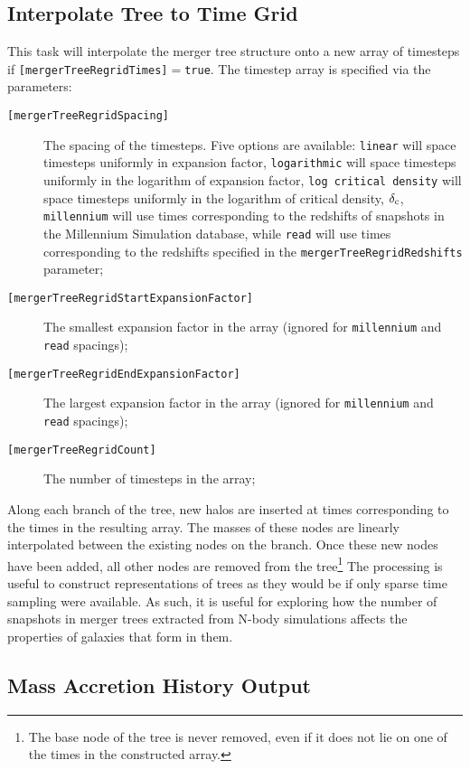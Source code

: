 \subsection{Interpolate Tree to Time Grid}\label{sec:MergerTreeTimeRegrid}

This task will interpolate the merger tree structure onto a new array of timesteps if {\tt [mergerTreeRegridTimes]}$=${\tt true}. The timestep array is specified via the parameters:
\begin{description}
\item[{\tt [mergerTreeRegridSpacing]}] The spacing of the timesteps. Five options are available: {\tt linear} will space timesteps uniformly in expansion factor, {\tt logarithmic} will space timesteps uniformly in the logarithm of expansion factor, {\tt log critical density} will space timesteps uniformly in the logarithm of critical density, $\delta_{\rm c}$, {\tt millennium} will use times corresponding to the redshifts of snapshots in the Millennium Simulation database, while {\tt read} will use times corresponding to the redshifts specified in the {\tt mergerTreeRegridRedshifts} parameter;
\item[{\tt [mergerTreeRegridStartExpansionFactor]}] The smallest expansion factor in the array (ignored for {\tt millennium} and {\tt read} spacings);
\item[{\tt [mergerTreeRegridEndExpansionFactor]}] The largest expansion factor in the array (ignored for {\tt millennium} and {\tt read} spacings);
\item[{\tt [mergerTreeRegridCount]}] The number of timesteps in the array;
\end{description}
Along each branch of the tree, new halos are inserted at times corresponding to the times in the resulting array. The masses of these nodes are linearly interpolated between the existing nodes on the branch. Once these new nodes have been added, all other nodes are removed from the tree\footnote{The base node of the tree is never removed, even if it does not lie on one of the times in the constructed array.} The processing is useful to construct representations of trees as they would be if only sparse time sampling were available. As such, it is useful for exploring how the number of snapshots in merger trees extracted from N-body simulations affects the properties of galaxies that form in them.

\subsection{Mass Accretion History Output}

